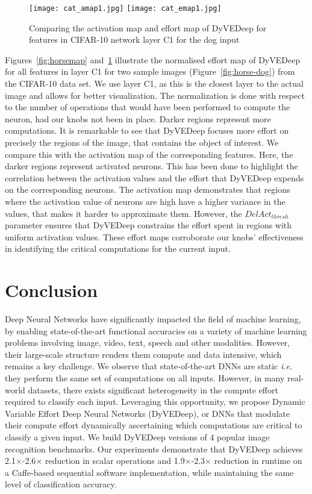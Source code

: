 \documentclass{article} %
\begin{document}
\begin{figure}[htb]
\begin{center}
\texttt{[image: cat\_amap1.jpg]} \texttt{[image: cat\_emap1.jpg]}
\end{center}
\caption{Comparing the activation map and effort map of DyVEDeep for features in CIFAR-10 network layer C1 for the dog input}
\label{fig:catmap}
\end{figure}

Figures~\ref{fig:horsemap} and~\ref{fig:catmap} illustrate the normalised effort map of DyVEDeep for all features in layer C1 for two sample images (Figure~\ref{fig:horse-dog}) from the CIFAR-10 data set. We use layer C1, as this is the closest layer to the actual image and allows for better visualization. The normalization is done with respect to the number of operations that would have been performed to compute the neuron, had our knobs not been in place. Darker regions represent more computations. It is remarkable to see that DyVEDeep focuses more effort on precisely the regions of the image, that contains the object of interest. We compare this with the activation map of the corresponding features. Here, the darker regions represent activated neurons. This has been done to highlight the correlation between the activation values and the effort that DyVEDeep expends on the corresponding neurons. 
The activation map demonstrates that regions where the activation value of neurons are high have a higher variance in the values, that makes it harder to approximate them. However, the $DelAct_{thresh}$ parameter ensures that DyVEDeep constrains the effort spent in regions with uniform activation values. These effort maps corroborate our knobs' effectiveness in identifying the critical computations for the current input.

\section{Conclusion}  \label{sec:conclusion}
Deep Neural Networks have significantly impacted the field of machine learning, by enabling state-of-the-art functional accuracies on a variety of machine learning problems involving image, video, text, speech and other modalities. However, their large-scale structure renders them compute and data intensive, which remains a key challenge. We observe that state-of-the-art DNNs are static \emph{i.e.} they perform the same set of computations on all inputs. However, in many real-world datasets, there exists significant heterogeneity in the compute effort required to classify each input. Leveraging this opportunity, we propose Dynamic Variable Effort Deep Neural Networks (DyVEDeep), or DNNs that modulate their compute effort dynamically ascertaining which computations are critical to classify a given input. We build DyVEDeep versions of 4 popular image recognition benchmarks. Our experiments demonstrate that DyVEDeep achieves 2.1$\times$-2.6$\times$ reduction in scalar operations and 1.9$\times$-2.3$\times$ reduction in runtime on a Caffe-based sequential software implementation, while maintaining the same level of classification accuracy.



\end{document}
